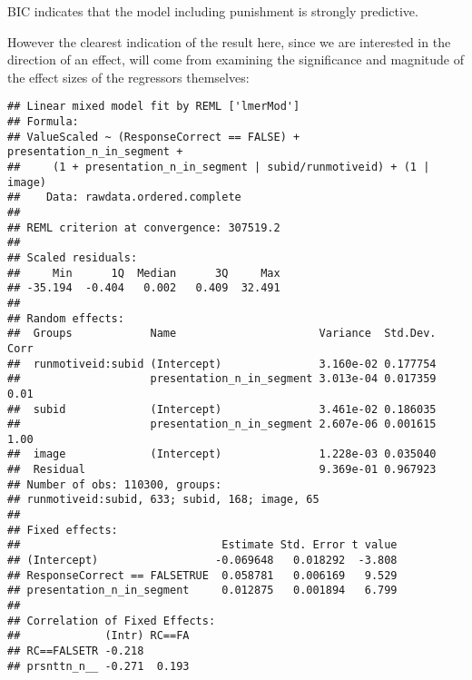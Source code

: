 \documentclass[]{article}
\begin{document}
BIC indicates that the model including punishment is strongly
predictive.

However the clearest indication of the result here, since we are
interested in the direction of an effect, will come from examining the
significance and magnitude of the effect sizes of the regressors
themselves:

\begin{verbatim}
## Linear mixed model fit by REML ['lmerMod']
## Formula: 
## ValueScaled ~ (ResponseCorrect == FALSE) + presentation_n_in_segment +  
##     (1 + presentation_n_in_segment | subid/runmotiveid) + (1 |      image)
##    Data: rawdata.ordered.complete
## 
## REML criterion at convergence: 307519.2
## 
## Scaled residuals: 
##     Min      1Q  Median      3Q     Max 
## -35.194  -0.404   0.002   0.409  32.491 
## 
## Random effects:
##  Groups            Name                      Variance  Std.Dev. Corr
##  runmotiveid:subid (Intercept)               3.160e-02 0.177754     
##                    presentation_n_in_segment 3.013e-04 0.017359 0.01
##  subid             (Intercept)               3.461e-02 0.186035     
##                    presentation_n_in_segment 2.607e-06 0.001615 1.00
##  image             (Intercept)               1.228e-03 0.035040     
##  Residual                                    9.369e-01 0.967923     
## Number of obs: 110300, groups:  
## runmotiveid:subid, 633; subid, 168; image, 65
## 
## Fixed effects:
##                               Estimate Std. Error t value
## (Intercept)                  -0.069648   0.018292  -3.808
## ResponseCorrect == FALSETRUE  0.058781   0.006169   9.529
## presentation_n_in_segment     0.012875   0.001894   6.799
## 
## Correlation of Fixed Effects:
##             (Intr) RC==FA
## RC==FALSETR -0.218       
## prsnttn_n__ -0.271  0.193
\end{verbatim}
\end{document}
